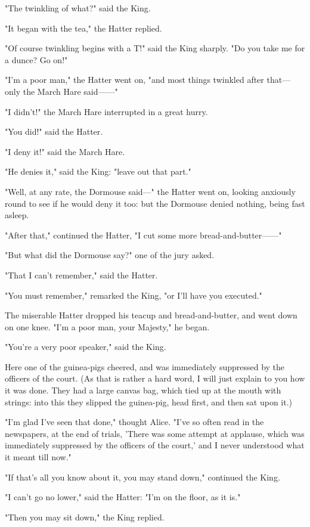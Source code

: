 "The twinkling of what?" said the King.

"It began with the tea," the Hatter replied.

"Of course twinkling begins with a T!" said ​the King sharply. "Do you take me for a dunce? Go on!"

"I'm a poor man," the Hatter went on, "and most things twinkled after that—only the March Hare said——"

"I didn't!" the March Hare interrupted in a great hurry.

"You did!" said the Hatter.

"I deny it!" said the March Hare.\quebra

"He denies it," said the King: "leave out that part."

"Well, at any rate, the Dormouse said—" the Hatter went on, looking anxiously round to see if he would deny it too: but the Dormouse denied nothing, being fast asleep.

"After that," continued the Hatter, "I cut some more bread-and-butter——"

"But what did the Dormouse say?" one of the jury asked.

"That I can't remember," said the Hatter.

"You must remember," remarked the King, "or I'll have you executed."

​The miserable Hatter dropped his teacup and bread-and-butter, and went down on one knee. "I'm a poor man, your Majesty," he began.

"You're a very poor speaker," said the King.

Here one of the guinea-pigs cheered, and was immediately suppressed by the officers of the court. (As that is rather a hard word, I will just explain to you how it was done. They had a large canvas bag, which tied up at the mouth with strings: into this they slipped the guinea-pig, head first, and then sat upon it.)

"I'm glad I've seen that done," thought Alice. "I've so often read in the newspapers, at the end of trials, 'There was some attempt at applause, which was immediately suppressed by the officers of the court,' and I never understood what it meant till now."

"If that's all you know about it, you may stand down," continued the King.

"I can't go no lower," said the Hatter: "I'm on the floor, as it is."

"Then you may sit down," the King replied.

